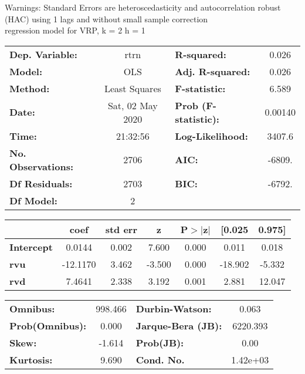 Warnings: \newline
 [1] Standard Errors are heteroscedasticity and autocorrelation robust (HAC) using 1 lags and without small sample correction\\ 

regression model for VRP, k = 2 h = 1\begin{center}
\begin{tabular}{lclc}
\toprule
\textbf{Dep. Variable:}    &       rtrn       & \textbf{  R-squared:         } &     0.026   \\
\textbf{Model:}            &       OLS        & \textbf{  Adj. R-squared:    } &     0.026   \\
\textbf{Method:}           &  Least Squares   & \textbf{  F-statistic:       } &     6.589   \\
\textbf{Date:}             & Sat, 02 May 2020 & \textbf{  Prob (F-statistic):} &  0.00140    \\
\textbf{Time:}             &     21:32:56     & \textbf{  Log-Likelihood:    } &    3407.6   \\
\textbf{No. Observations:} &        2706      & \textbf{  AIC:               } &    -6809.   \\
\textbf{Df Residuals:}     &        2703      & \textbf{  BIC:               } &    -6792.   \\
\textbf{Df Model:}         &           2      & \textbf{                     } &             \\
\bottomrule
\end{tabular}
\begin{tabular}{lcccccc}
                   & \textbf{coef} & \textbf{std err} & \textbf{z} & \textbf{P$> |$z$|$} & \textbf{[0.025} & \textbf{0.975]}  \\
\midrule
\textbf{Intercept} &       0.0144  &        0.002     &     7.600  &         0.000        &        0.011    &        0.018     \\
\textbf{rvu}       &     -12.1170  &        3.462     &    -3.500  &         0.000        &      -18.902    &       -5.332     \\
\textbf{rvd}       &       7.4641  &        2.338     &     3.192  &         0.001        &        2.881    &       12.047     \\
\bottomrule
\end{tabular}
\begin{tabular}{lclc}
\textbf{Omnibus:}       & 998.466 & \textbf{  Durbin-Watson:     } &    0.063  \\
\textbf{Prob(Omnibus):} &   0.000 & \textbf{  Jarque-Bera (JB):  } & 6220.393  \\
\textbf{Skew:}          &  -1.614 & \textbf{  Prob(JB):          } &     0.00  \\
\textbf{Kurtosis:}      &   9.690 & \textbf{  Cond. No.          } & 1.42e+03  \\
\bottomrule
\end{tabular}
\end{center}

